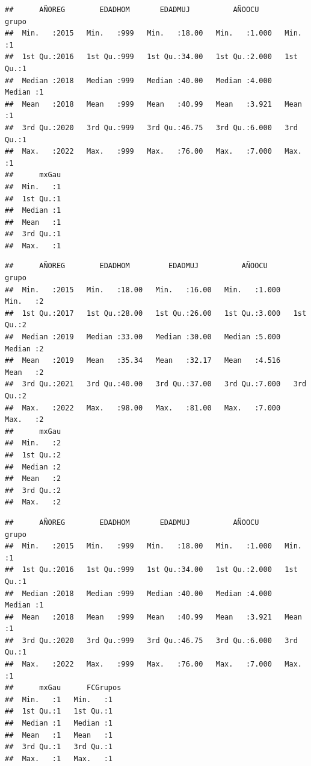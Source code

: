 \documentclass[
]{article}
\begin{document}
\begin{verbatim}
##      AÑOREG        EDADHOM       EDADMUJ          AÑOOCU          grupo  
##  Min.   :2015   Min.   :999   Min.   :18.00   Min.   :1.000   Min.   :1  
##  1st Qu.:2016   1st Qu.:999   1st Qu.:34.00   1st Qu.:2.000   1st Qu.:1  
##  Median :2018   Median :999   Median :40.00   Median :4.000   Median :1  
##  Mean   :2018   Mean   :999   Mean   :40.99   Mean   :3.921   Mean   :1  
##  3rd Qu.:2020   3rd Qu.:999   3rd Qu.:46.75   3rd Qu.:6.000   3rd Qu.:1  
##  Max.   :2022   Max.   :999   Max.   :76.00   Max.   :7.000   Max.   :1  
##      mxGau  
##  Min.   :1  
##  1st Qu.:1  
##  Median :1  
##  Mean   :1  
##  3rd Qu.:1  
##  Max.   :1
\end{verbatim}

\begin{verbatim}
##      AÑOREG        EDADHOM         EDADMUJ          AÑOOCU          grupo  
##  Min.   :2015   Min.   :18.00   Min.   :16.00   Min.   :1.000   Min.   :2  
##  1st Qu.:2017   1st Qu.:28.00   1st Qu.:26.00   1st Qu.:3.000   1st Qu.:2  
##  Median :2019   Median :33.00   Median :30.00   Median :5.000   Median :2  
##  Mean   :2019   Mean   :35.34   Mean   :32.17   Mean   :4.516   Mean   :2  
##  3rd Qu.:2021   3rd Qu.:40.00   3rd Qu.:37.00   3rd Qu.:7.000   3rd Qu.:2  
##  Max.   :2022   Max.   :98.00   Max.   :81.00   Max.   :7.000   Max.   :2  
##      mxGau  
##  Min.   :2  
##  1st Qu.:2  
##  Median :2  
##  Mean   :2  
##  3rd Qu.:2  
##  Max.   :2
\end{verbatim}

\begin{verbatim}
##      AÑOREG        EDADHOM       EDADMUJ          AÑOOCU          grupo  
##  Min.   :2015   Min.   :999   Min.   :18.00   Min.   :1.000   Min.   :1  
##  1st Qu.:2016   1st Qu.:999   1st Qu.:34.00   1st Qu.:2.000   1st Qu.:1  
##  Median :2018   Median :999   Median :40.00   Median :4.000   Median :1  
##  Mean   :2018   Mean   :999   Mean   :40.99   Mean   :3.921   Mean   :1  
##  3rd Qu.:2020   3rd Qu.:999   3rd Qu.:46.75   3rd Qu.:6.000   3rd Qu.:1  
##  Max.   :2022   Max.   :999   Max.   :76.00   Max.   :7.000   Max.   :1  
##      mxGau      FCGrupos
##  Min.   :1   Min.   :1  
##  1st Qu.:1   1st Qu.:1  
##  Median :1   Median :1  
##  Mean   :1   Mean   :1  
##  3rd Qu.:1   3rd Qu.:1  
##  Max.   :1   Max.   :1
\end{verbatim}
\end{document}
